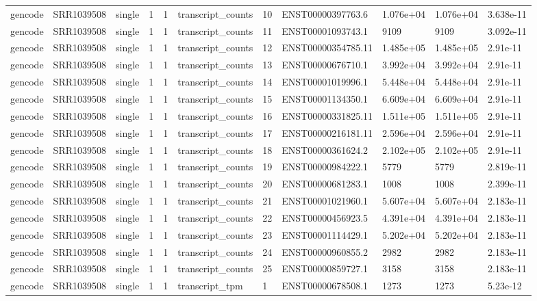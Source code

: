 \begin{tabular}{lllllllllll}
gencode & SRR1039508 & single & 1 & 1 & transcript\_counts & 10 & ENST00000397763.6 & 1.076e+04 & 1.076e+04 & 3.638e-11 \\
gencode & SRR1039508 & single & 1 & 1 & transcript\_counts & 11 & ENST00001093743.1 & 9109 & 9109 & 3.092e-11 \\
gencode & SRR1039508 & single & 1 & 1 & transcript\_counts & 12 & ENST00000354785.11 & 1.485e+05 & 1.485e+05 & 2.91e-11 \\
gencode & SRR1039508 & single & 1 & 1 & transcript\_counts & 13 & ENST00000676710.1 & 3.992e+04 & 3.992e+04 & 2.91e-11 \\
gencode & SRR1039508 & single & 1 & 1 & transcript\_counts & 14 & ENST00001019996.1 & 5.448e+04 & 5.448e+04 & 2.91e-11 \\
gencode & SRR1039508 & single & 1 & 1 & transcript\_counts & 15 & ENST00001134350.1 & 6.609e+04 & 6.609e+04 & 2.91e-11 \\
gencode & SRR1039508 & single & 1 & 1 & transcript\_counts & 16 & ENST00000331825.11 & 1.511e+05 & 1.511e+05 & 2.91e-11 \\
gencode & SRR1039508 & single & 1 & 1 & transcript\_counts & 17 & ENST00000216181.11 & 2.596e+04 & 2.596e+04 & 2.91e-11 \\
gencode & SRR1039508 & single & 1 & 1 & transcript\_counts & 18 & ENST00000361624.2 & 2.102e+05 & 2.102e+05 & 2.91e-11 \\
gencode & SRR1039508 & single & 1 & 1 & transcript\_counts & 19 & ENST00000984222.1 & 5779 & 5779 & 2.819e-11 \\
gencode & SRR1039508 & single & 1 & 1 & transcript\_counts & 20 & ENST00000681283.1 & 1008 & 1008 & 2.399e-11 \\
gencode & SRR1039508 & single & 1 & 1 & transcript\_counts & 21 & ENST00001021960.1 & 5.607e+04 & 5.607e+04 & 2.183e-11 \\
gencode & SRR1039508 & single & 1 & 1 & transcript\_counts & 22 & ENST00000456923.5 & 4.391e+04 & 4.391e+04 & 2.183e-11 \\
gencode & SRR1039508 & single & 1 & 1 & transcript\_counts & 23 & ENST00001114429.1 & 5.202e+04 & 5.202e+04 & 2.183e-11 \\
gencode & SRR1039508 & single & 1 & 1 & transcript\_counts & 24 & ENST00000960855.2 & 2982 & 2982 & 2.183e-11 \\
gencode & SRR1039508 & single & 1 & 1 & transcript\_counts & 25 & ENST00000859727.1 & 3158 & 3158 & 2.183e-11 \\
gencode & SRR1039508 & single & 1 & 1 & transcript\_tpm & 1 & ENST00000678508.1 & 1273 & 1273 & 5.23e-12 \\

\end{tabular}
